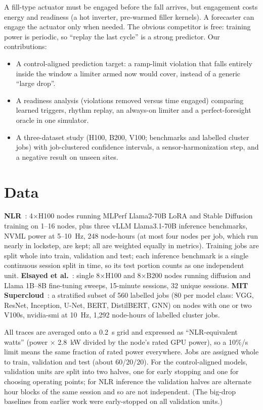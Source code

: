\documentclass[conference]{IEEEtran}
\begin{document}
A fill-type actuator must be engaged before the fall arrives, but engagement costs energy and readiness
(a hot inverter, pre-warmed filler kernels). A forecaster can engage the actuator only when needed. The
obvious competitor is free: training power is periodic, so ``replay the last cycle'' is a strong
predictor. Our contributions:
\begin{itemize}
\item A control-aligned prediction target: a ramp-limit violation that falls entirely inside the window
a limiter armed now would cover, instead of a generic ``large drop''.
\item A readiness analysis (violations removed versus time engaged) comparing learned triggers, rhythm
replay, an always-on limiter and a perfect-foresight oracle in one simulator.
\item A three-dataset study (H100, B200, V100; benchmarks and labelled cluster jobs) with job-clustered confidence
intervals, a sensor-harmonization step, and a negative result on unseen sites.
\end{itemize}

\section{Data}
\textbf{NLR}~\cite{nlr}: 4$\times$H100 nodes running MLPerf Llama2-70B LoRA and Stable Diffusion
training on 1--16 nodes, plus three vLLM Llama3.1-70B inference benchmarks, NVML power at 5--10~Hz,
248 node-hours (at most four nodes per job, which run nearly in lockstep, are kept; all
are weighted equally in metrics). Training jobs are split whole into train, validation and test; each
inference benchmark is a single continuous session split in time, so its test portion counts as one
independent unit. \textbf{Elsayed et al.}~\cite{elsayed}: single 8$\times$H100 and 8$\times$B200 nodes
running diffusion and Llama 1B--8B fine-tuning sweeps, 15-minute sessions, 32 unique
sessions. \textbf{MIT Supercloud}~\cite{supercloud}: a stratified subset of 560 labelled jobs (80 per
model class: VGG, ResNet, Inception, U-Net, BERT, DistilBERT, GNN) on nodes with one or two V100s,
nvidia-smi at 10~Hz, 1,292 node-hours of labelled cluster jobs.

All traces are averaged onto a 0.2~s grid and expressed as ``NLR-equivalent watts'' (power $\times$
2.8~kW divided by the node's rated GPU power), so a 10\%/s limit means the same fraction of rated power
everywhere. Jobs are assigned whole to train, validation and test (about 60/20/20). For the
control-aligned models, validation units are split into two halves, one for early stopping and one for
choosing operating points; for NLR inference the validation halves are alternate hour blocks of the
same session and so are not independent. (The big-drop baselines from earlier work were early-stopped on all
validation units.)
\end{document}
